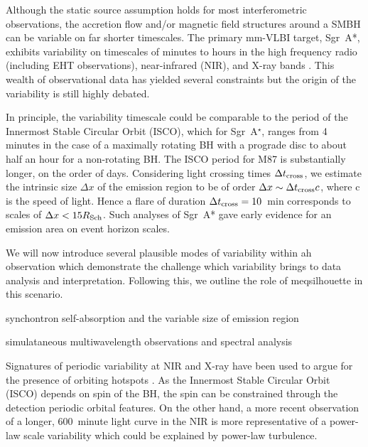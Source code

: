 Although the static source assumption holds for most interferometric observations, the accretion flow and/or magnetic field structures around a SMBH can be variable on far shorter timescales. The primary mm-VLBI target, Sgr~A*,  exhibits variability on timescales of minutes to hours in the high frequency radio (including EHT observations), near-infrared (NIR), and X-ray bands \citep[e.g.][]{Baganoff_2001, Genzel_2003, Yusef-Zadeh_2006, Maronne_2006, Fish_2011, Johnson_2015b}. This wealth of observational data has yielded several constraints but the origin of the variability is still highly debated.


In principle, the variability timescale could be comparable to the period of the Innermost Stable Circular Orbit (ISCO), which for Sgr~A$^\star$, ranges from 4 minutes in the case of a maximally rotating BH with a prograde disc to about half an hour for a non-rotating BH. The ISCO period for M87 is substantially longer, on the order of days. Considering light crossing times $\Delta t_{\rm cross}$, we estimate the intrinsic size $\Delta x$ of the emission region to be of order $\Delta x \sim \Delta t_{\rm cross} c$, where c is the speed of light. Hence a flare of duration $ \Delta t_{\rm cross} =10$~min corresponds to scales of  $\Delta x < 15 R_{\rm Sch}$. Such analyses of Sgr~A* gave early evidence for an emission area on event horizon scales.


We will now introduce several plausible modes of variability within ah observation which demonstrate the challenge which variability brings to data analysis and interpretation. Following this, we outline the role of {\sc meqsilhouette} in this scenario.

synchontron self-absorption and the variable size of emission region

simulataneous multiwavelength observations and spectral analysis

Signatures of periodic variability at NIR and X-ray \citep{Genzel_2003,Belanger_2006} have been used to argue for the presence of orbiting hotspots \cite{Doeleman_2009}. As the Innermost Stable Circular Orbit (ISCO) depends on spin of the BH, the spin can be constrained through the detection periodic orbital features. On the other hand, a more recent observation of a longer, 600~minute light curve in the NIR is more representative of a power-law scale variability \cite{Meyer_2008} which could be explained by power-law turbulence. 


